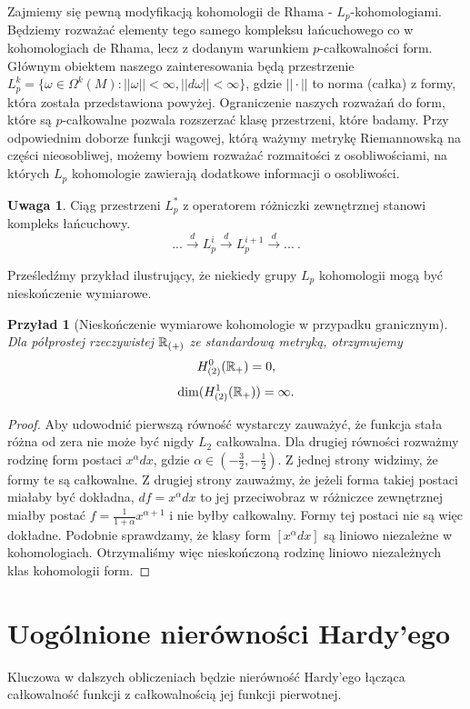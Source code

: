 \documentclass[licencjacka]{pracamgr}
\theoremstyle{definition}
\theoremstyle{definition}
\newtheorem{remark}{Uwaga}[section]
\theoremstyle{plain}
\theoremstyle{plain}
\theoremstyle{plain}
\theoremstyle{plain}
\newtheorem{example}{Przyład}[section]
\theoremstyle{plain}
\def\R{\ensuremath\mathbb{R}}
\begin{document}
Zajmiemy się pewną modyfikacją kohomologii de Rhama - $L_p$-kohomologiami.
Będziemy rozważać elementy tego samego kompleksu łańcuchowego co w
kohomologiach de Rhama, lecz z dodanym warunkiem $p$-całkowalności form.
Głównym obiektem naszego zainteresowania będą przestrzenie $L_p^k = \{\omega
\in \Omega^k(M): ||\omega|| <\infty, ||d \omega || < \infty \}$, gdzie $||
\cdot ||$ to norma (całka) z formy, która została przedstawiona powyżej.
Ograniczenie naszych rozważań do form, które są $p$-całkowalne pozwala
rozszerzać klasę przestrzeni, które badamy. Przy odpowiednim doborze funkcji
wagowej, którą ważymy metrykę Riemannowską na części nieosobliwej, możemy
bowiem rozważać rozmaitości z osobliwościami, na których $L_p$ kohomologie
zawierają dodatkowe informacji o osobliwości. \\

\begin{remark}
Ciąg przestrzeni $L^\ast_p$ z operatorem różniczki zewnętrznej stanowi
kompleks łańcuchowy.
\[
   ... \xrightarrow{d} 
L_p^i 
   \xrightarrow{d} 
L_p^{i+1}
   \xrightarrow{d} 
...~.
\]
\end{remark}
Prześledźmy przykład ilustrujący, że niekiedy grupy $L_p$ kohomologii mogą być
nieskończenie wymiarowe.
\begin{example}[Nieskończenie wymiarowe kohomologie w przypadku granicznym]\label{infty-boundary-cohomologies}
Dla  półprostej rzeczywistej $\R_{(+)}$ ze standardową metryką, otrzymujemy 
\[
H^0_{(2)}( \R_{+}) = 0,
\]
\[
\dim( H^1_{(2)}( \R_{+}) ) = \infty.
\]
\end{example}
\begin{proof}
Aby udowodnić pierwszą równość wystarczy zauważyć, że funkcja stała różna od
zera nie może być nigdy $L_2$ całkowalna.  Dla drugiej równości rozważmy
rodzinę form postaci $x^\alpha dx$, gdzie $\alpha \in (-\frac{3}{2},
-\frac{1}{2})$. Z jednej strony widzimy, że formy te są całkowalne. Z drugiej
strony zauważmy, że jeżeli forma takiej postaci miałaby być dokładna, $df =
x^\alpha dx $ to jej przeciwobraz w różniczce zewnętrznej miałby postać $f =
\frac{1}{1 + \alpha} x^{\alpha + 1}$ i nie byłby całkowalny. Formy tej postaci
nie są więc dokładne. Podobnie sprawdzamy, że klasy form $[x^\alpha dx]$ są
liniowo niezależne w kohomologiach.  Otrzymaliśmy więc nieskończoną rodzinę
liniowo niezależnych klas kohomologii form.
\end{proof}

\section{Uogólnione nierówności Hardy'ego}
Kluczowa w dalszych obliczeniach będzie nierówność Hardy'ego łącząca całkowalność
funkcji z całkowalnością jej funkcji pierwotnej.
\end{document}

